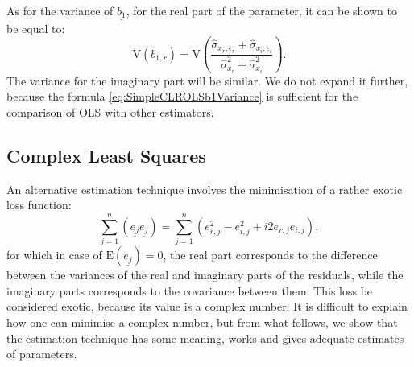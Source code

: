\documentclass[
]{book}
\begin{document}
As for the variance of \(\underline{b_1}\), for the real part of the parameter, it can be shown to be equal to:
\begin{equation}
    \mathrm{V}(b_{1,r}) = \mathrm{V}\left(\frac{\hat{\sigma}_{x_r, \epsilon_r} + \hat{\sigma}_{x_i, \epsilon_i}}{\hat{\sigma}_{x_r}^2 + \hat{\sigma}_{x_i}^2}\right) .
    \label{eq:SimpleCLROLSb1Variance}
\end{equation}
The variance for the imaginary part will be similar. We do not expand it further, because the formula \eqref{eq:SimpleCLROLSb1Variance} is sufficient for the comparison of OLS with other estimators.

\hypertarget{SCLREstimationCLS}{%
\subsection{Complex Least Squares}\label{SCLREstimationCLS}}

An alternative estimation technique involves the minimisation of a rather exotic loss function:
\begin{equation}
    \sum_{j=1}^n (\underline{e_j} \underline{e_j}) = \sum_{j=1}^n (e_{r,j}^2 - e_{i,j}^2 + i 2 e_{r,j} e_{i,j}),
    \label{eq:SimpleCLRCLSLoss}
\end{equation}
for which in case of \(\mathrm{E}(\underline{e_j})=0\), the real part corresponds to the difference between the variances of the real and imaginary parts of the residuals, while the imaginary parts corresponds to the covariance between them. This loss be considered exotic, because its value is a complex number. It is difficult to explain how one can minimise a complex number, but from what follows, we show that the estimation technique has some meaning, works and gives adequate estimates of parameters.
\end{document}
